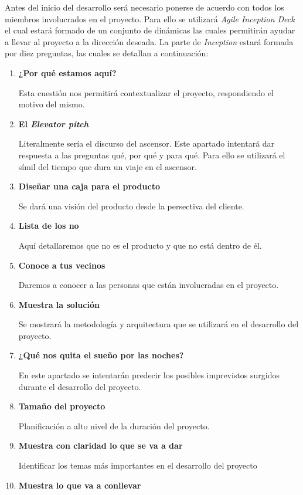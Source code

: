 Antes del inicio del desarrollo será necesario ponerse de acuerdo con todos los miembros involucrados en el proyecto.
Para ello se utilizará \textit{Agile Inception Deck} el cual estará formado de un conjunto de dinámicas las cuales permitirán
ayudar a llevar al proyecto a la dirección deseada. La parte de \textit{Inception} estará formada por diez preguntas, las
cuales se detallan a continuación:

\begin{enumerate}
  \item \textbf{¿Por qué estamos aquí?}

    Esta cuestión nos permitirá contextualizar el proyecto, respondiendo el motivo del mismo.
  \item \textbf{El \textit{Elevator pitch}}

    Literalmente sería el discurso del ascensor. Este apartado intentará dar respuesta a las preguntas qué, por qué y para qué.
    Para ello se utilizará el símil del tiempo que dura un viaje en el ascensor.
  \item \textbf{Diseñar una caja para el producto}

    Se dará una visión del producto desde la persectiva del cliente.
  \item \textbf{Lista de los no}

    Aquí detallaremos que no es el producto y que no está dentro de él.
  \item \textbf{Conoce a tus vecinos}

    Daremos a conocer a las personas que están involucradas en el proyecto.
  \item \textbf{Muestra la solución}

    Se mostrará la metodología y arquitectura que se utilizará en el desarrollo del proyecto.
  \item \textbf{¿Qué nos quita el sueño por las noches?}

    En este apartado se intentarán predecir los posibles imprevistos surgidos durante
    el desarrollo del proyecto.
  \item \textbf{Tamaño del proyecto}

    Planificación a alto nivel de la duración del proyecto.
  \item \textbf{Muestra con claridad lo que se va a dar}

    Identificar los temas más importantes en el desarrollo del proyecto
  \item \textbf{Muestra lo que va a conllevar}
\end{enumerate}
